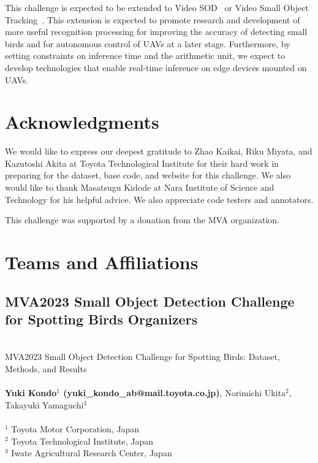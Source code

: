 \documentclass{mva_style}
\begin{document}
This challenge is expected to be extended to Video SOD~\cite{rekavandi2022guide,bosquet2021correlation} or Video Small Object Tracking~\cite{zhu2023tiny,zhang2022tracking}. This extension is expected to promote research and development of more useful recognition processing for improving the accuracy of detecting small birds and for autonomous control of UAVs at a later stage. Furthermore, by setting constraints on inference time and the arithmetic unit, we expect to develop technologies that enable real-time inference on edge devices mounted on UAVs.

\section{Acknowledgments}
We would like to express our deepest gratitude to Zhao Kaikai, Riku
Miyata, and Kazutoshi Akita at Toyota Technological Institute for
their hard work in preparing for the dataset, base code, and website
for this challenge. We also would like to thank Masatsugu Kidode at
Nara Institute of Science and Technology for his helpful advice. We
also appreciate code testers and annotators.

This challenge was supported by a donation from the MVA organization.


\appendix
\section{Teams and Affiliations}
\label{sec:apd:team}

\subsection*{MVA2023 Small Object Detection Challenge for Spotting Birds Organizers}
\\ MVA2023 Small Object Detection Challenge for Spotting Birds: Dataset, Methods, and Results\\
\\ \textbf{Yuki Kondo$^1$ (yuki\_kondo\_ab@mail.toyota.co.jp)}, Norimichi Ukita$^2$, Takayuki Yamaguchi$^3$\\
\\
$^1$ Toyota Motor Corporation, Japan\\
$^2$ Toyota Technological Institute, Japan\\
$^3$ Iwate Agricultural Research Center, Japan\\
\end{document}
